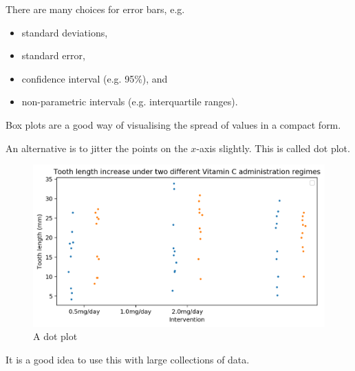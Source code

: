 \documentclass[a4paper, openany]{memoir}
\begin{document}
There are many choices for error bars, e.g.
\begin{itemize}
    \item standard deviations,
    \item standard error,
    \item confidence interval (e.g. 95\%), and
    \item non-parametric intervals (e.g. interquartile ranges).
\end{itemize}
Box plots are a good way of visualising the spread of values in a compact form.

An alternative is to jitter the points on the $x$-axis slightly. This is called dot plot.
\begin{figure}[H]
    \centering
    \includegraphics[scale=0.6]{src/2.66 dot plot.png}
    \caption{A dot plot}
\end{figure}
\noindent It is a good idea to use this with large collections of data.
\end{document}
